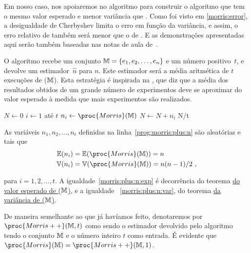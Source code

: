 Em nosso caso, nos apoiaremos no algoritmo  para construir o algoritmo  que tem o mesmo 
valor esperado e menor variância que . Como foi visto em \eqref{morris:error}, a desigualdade de Cherbyshev
limita o erro em função da variância, e assim, o erro relativo de  também será menor que o de 
. E as demonstrações apresentadas aqui serão também baseadas nas notas de aula 
de~\citep{LectureNotesAndoni}.

O algoritmo  recebe um conjunto $\mathbb{M} = \{ e_1, e_2, \dots, e_n \}$ e um número positivo~$t$, e devolve 
um estimador~$\hat{n}$ para $n$. Este estimador será a média aritmética de $t$ execuções de ($\mathbb{M}$). Esta 
estratégia é inspirada na , que diz que a média dos resultados obtidos de um grande número 
de experimentos deve se aproximar do valor esperado à medida que mais experimentos são realizados.

\begin{codebox}
  \li $N \gets 0$                       \label{prog:morris:plus:start}                
  \li \For $i \gets 1$ até $t$                             
  \li \Do
      $n_i \gets \proc{Morris}(\Mbb)$   \label{prog:morris:plus:n}
  \li $N \gets N + n_i$
      \End
  \li
  \Return N/t
  \End
\end{codebox}

As variáveis $n_1, n_2, \dots, n_t$ definidas na linha~\ref{prog:morris:plus:n} são aleatórias e tais que
\begin{align}
  \Ebb(n_i) &= \Ebb(\proc{Morris}(\Mbb)) = n                \label{morris:plus:n:exp} \\     
  \Vbb(n_i) &= \Vbb(\proc{Morris}(\Mbb)) = n(n - 1)/2 \ ,   \label{morris:plus:n:var}
\end{align}

para $i = 1, 2, \dots, t$. A igualdade~\eqref{morris:plus:n:exp} é decorrência do teorema 
\hyperref[morris:theorem:expected_value]{do valor esperado de ($\mathbb{M}$)}, e a igualdade~
\eqref{morris:plus:n:var}, do teorema \hyperref[morris:theorem:variance]{da variância de ($\mathbb{M}$)}.

De maneira semelhante ao que já havíamos feito, denotaremos por $\proc{Morris++}(\Mbb, t)$ como sendo o estimador 
devolvido pelo algoritmo tendo o conjunto $\mathbb{M}$ e o número inteiro $t$ como entrada. É evidente que 
$\proc{Morris}(\Mbb) = \proc{Morris++}(\Mbb, 1)$.

